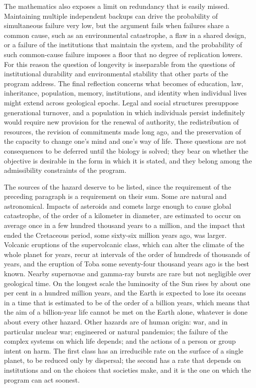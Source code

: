 The mathematics also exposes a limit on redundancy that is easily missed. Maintaining multiple independent backups can drive the probability of simultaneous failure very low, but the argument fails when failures share a common cause, such as an environmental catastrophe, a flaw in a shared design, or a failure of the institutions that maintain the system, and the probability of such common-cause failure imposes a floor that no degree of replication lowers. For this reason the question of longevity is inseparable from the questions of institutional durability and environmental stability that other parts of the program address. The final reflection concerns what becomes of education, law, inheritance, population, memory, institutions, and identity when individual lives might extend across geological epochs. Legal and social structures presuppose generational turnover, and a population in which individuals persist indefinitely would require new provision for the renewal of authority, the redistribution of resources, the revision of commitments made long ago, and the preservation of the capacity to change one's mind and one's way of life. These questions are not consequences to be deferred until the biology is solved; they bear on whether the objective is desirable in the form in which it is stated, and they belong among the admissibility constraints of the program.

The sources of the hazard deserve to be listed, since the requirement of the preceding paragraph is a requirement on their sum. Some are natural and astronomical. Impacts of asteroids and comets large enough to cause global catastrophe, of the order of a kilometer in diameter, are estimated to occur on average once in a few hundred thousand years to a million, and the impact that ended the Cretaceous period, some sixty-six million years ago, was larger. Volcanic eruptions of the supervolcanic class, which can alter the climate of the whole planet for years, recur at intervals of the order of hundreds of thousands of years, and the eruption of Toba some seventy-four thousand years ago is the best known. Nearby supernovae and gamma-ray bursts are rare but not negligible over geological time. On the longest scale the luminosity of the Sun rises by about one per cent in a hundred million years, and the Earth is expected to lose its oceans in a time that is estimated to be of the order of a billion years, which means that the aim of a billion-year life cannot be met on the Earth alone, whatever is done about every other hazard. Other hazards are of human origin: war, and in particular nuclear war; engineered or natural pandemics; the failure of the complex systems on which life depends; and the actions of a person or group intent on harm. The first class has an irreducible rate on the surface of a single planet, to be reduced only by dispersal; the second has a rate that depends on institutions and on the choices that societies make, and it is the one on which the program can act soonest.

